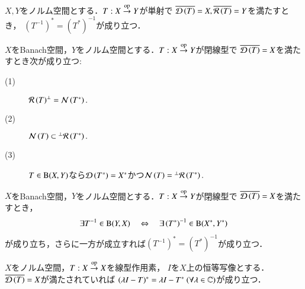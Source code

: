 	\begin{screen}
		\begin{thm}
			$X,Y$をノルム空間とする．$T:X \overset{\mathrm{op}}{\rightarrow} Y$が単射で
			$\closure{\Dom{T} } = X, \closure{\Ran{T} } = Y$を満たすとき，
			$\left( T^{-1} \right)^* = \left( T^* \right)^{-1}$が成り立つ．
		\end{thm}
	\end{screen}
	
	\begin{screen}
		\begin{lem}
			$X$をBanach空間，$Y$をノルム空間とする．$T:X \overset{\mathrm{op}}{\rightarrow} Y$が閉線型で
			$\closure{\Dom{T} } = X$を満たすとき次が成り立つ:
			\begin{description}
				\item[(1)] ${\mathcal{R}\left(T\right) }^{\perp} = \mathcal{N}\left(T^*\right) .$
				\item[(2)] $\mathcal{N}\left(T\right) \subset {}^\perp \mathcal{R}\left(T^*\right) .$
				\item[(3)] $T \in \mathrm{B}(X,Y) $なら$\Dom{T^*} = X^*$かつ$\mathcal{N}\left(T\right) = {}^\perp \mathcal{R}\left(T^*\right) .$
			\end{description}
		\end{lem}
	\end{screen}
	
	\begin{screen}
		\begin{thm}
			$X$をBanach空間，$Y$をノルム空間とする．$T:X \overset{\mathrm{op}}{\rightarrow} Y$が閉線型で
			$\closure{\Dom{T} } = X$を満たすとき，
			\begin{align}
				\exists T^{-1} \in \mathrm{B}(Y,X)
				\quad \Leftrightarrow \quad
				\exists \left( T^* \right)^{-1} \in \mathrm{B}(X^*,Y^*)
			\end{align}
			が成り立ち，さらに一方が成立すれば$\left( T^{-1} \right)^* = \left( T^* \right)^{-1}$が成り立つ．
		\end{thm}
	\end{screen}
	
	\begin{screen}
		\begin{thm}
			$X$をノルム空間，$T:X \overset{\mathrm{op}}{\rightarrow} X$を線型作用素，
			$I$を$X$上の恒等写像とする．$\closure{\Dom{T} } = X$が満たされていれば
			$(\lambda I - T)^* = \lambda I - T^*\ (\forall \lambda \in \mathbb{C})$が成り立つ．
		\end{thm}
	\end{screen}
	
